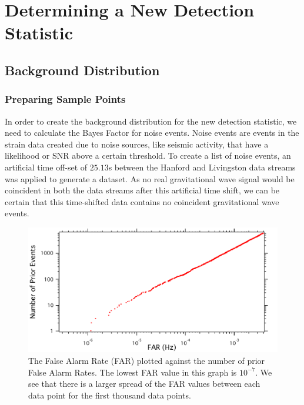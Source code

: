 \documentclass{article}
\begin{document}
 
 \section{Determining a New Detection Statistic}
 
 
 \subsection{Background Distribution}
 
 
 \subsubsection{Preparing Sample Points}
 In order to create the background distribution for the new detection statistic, we need to calculate the Bayes Factor for noise events. Noise events are events in the strain data created due to noise sources, like seismic activity, that have a likelihood or SNR above a certain threshold. To create a list of noise events, an artificial time off-set of $25.13$s between the Hanford and Livingston data streams was applied to generate a dataset. As no real gravitational wave signal would be coincident in both the data streams after this artificial time shift, we can be certain that this time-shifted data contains no coincident gravitational wave events. \\
 
  
  \begin{figure}[h]
  	\centering
  	\includegraphics[width=1\textwidth]{Figures/FAP_Count.pdf} 
  	\caption{The False Alarm Rate (FAR) plotted against the number of prior False Alarm Rates. The lowest FAR value in this graph is $10^{-7}$. We see that there is a larger spread of the FAR values between each data point for the first thousand data points.}
  	\label{Fig:FAR_Count}
  \end{figure}
\end{document}
